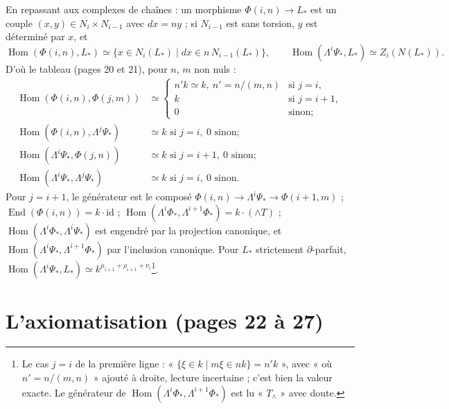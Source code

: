 \documentclass[11pt,a4paper]{article}
\begin{document}
En repassant aux complexes de chaînes : un morphisme $\Phi(i,n) \to L_{*}$
est un couple $(x, y) \in N_{i} \times N_{i-1}$ avec $dx = ny$ ; si
$N_{i-1}$ est sans torsion, $y$ est déterminé par $x$, et
\[
  \operatorname{Hom}(\Phi(i,n), L_{*}) \simeq \{ x \in N_{i}(L_{*}) \mid
  dx \in n\, N_{i-1}(L_{*}) \}, \qquad
  \operatorname{Hom}(\Lambda^{i}\Psi_{*}, L_{*}) \simeq Z_{i}(N(L_{*})) .
\]
D'où le tableau (pages 20 et 21), pour $n$, $m$ non nuls :
\[
\begin{aligned}
\operatorname{Hom}(\Phi(i,n), \Phi(j,m)) &\simeq
  \begin{cases}
    n'k \simeq k, \ n' = n/(m,n) & \text{si } j = i, \\
    k & \text{si } j = i+1, \\
    0 & \text{sinon} ;
  \end{cases} \\
\operatorname{Hom}(\Phi(i,n), \Lambda^{j}\Psi_{*}) &\simeq k \text{ si } j = i,
  \ 0 \text{ sinon} ; \\
\operatorname{Hom}(\Lambda^{i}\Psi_{*}, \Phi(j,n)) &\simeq k \text{ si } j = i+1,
  \ 0 \text{ sinon} ; \\
\operatorname{Hom}(\Lambda^{i}\Psi_{*}, \Lambda^{j}\Psi_{*}) &\simeq k \text{ si }
  j = i, \ 0 \text{ sinon}.
\end{aligned}
\]
Pour $j = i+1$, le générateur est le composé $\Phi(i,n) \to
\Lambda^{i}\Psi_{*} \to \Phi(i+1,m)$ ; $\operatorname{End}(\Phi(i,n)) =
k \cdot \mathrm{id}$ ; $\operatorname{Hom}(\Lambda^{i}\Phi_{*},
\Lambda^{i+1}\Phi_{*}) = k \cdot (\wedge T)$ ; $\operatorname{Hom}(\Lambda^{i}\Phi_{*},
\Lambda^{i}\Psi_{*})$ est engendré par la projection canonique, et
$\operatorname{Hom}(\Lambda^{i}\Psi_{*}, \Lambda^{i+1}\Phi_{*})$ par
l'inclusion canonique. Pour $L_{*}$ strictement $\partial$-parfait,
$\operatorname{Hom}(\Lambda^{i}\Psi_{*}, L_{*}) \simeq k^{\mu_{i+1} +
\rho_{i+1} + \nu_{i}}$\footnote{Le cas $j = i$ de la première ligne : « $\{\xi
\in k \mid m\xi \in nk\} = n'k$ », avec « où $n' = n/(m,n)$ » ajouté à droite,
lecture incertaine ; c'est bien la valeur exacte. Le générateur de
$\operatorname{Hom}(\Lambda^{i}\Phi_{*}, \Lambda^{i+1}\Phi_{*})$ est lu
« $T_{\wedge}$ » avec doute.}.

\section*{L'axiomatisation (pages 22 à 27)}
\end{document}
